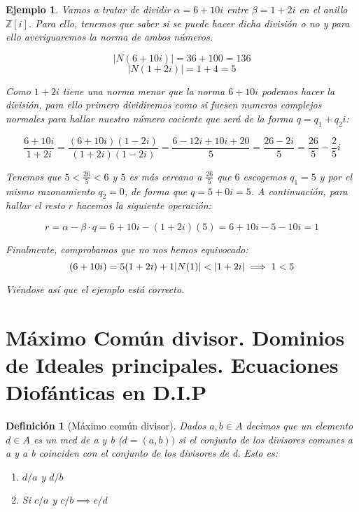 \documentclass[11pt, a4paper, titlepage]{article}
\providecommand{\ent}{\mathbb{Z}}
\providecommand{\abs}[1]{\lvert#1\rvert}
\theoremstyle{theorem-style}
\theoremstyle{definition-style}
\newtheorem*{ndef}{Definición}
\theoremstyle{remark-style}
\theoremstyle{example-style}
\newtheorem*{ejemplo}{Ejemplo}
\newenvironment{nlist}
{\begin{enumerate}
\renewcommand\labelenumi{(\emph{\roman{enumi})}}}
{\end{enumerate}}
\begin{document}
\begin{ejemplo}
Vamos a tratar de dividir $\alpha=6+10i$ entre $\beta=1+2i$ en el anillo $\ent[i]$. Para ello, tenemos que saber si se puede hacer dicha división o no y para ello averiguaremos la norma de ambos números.

$$\abs{N(6+10i)}=36+100=136$$
$$\abs{N(1+2i)}=1+4=5$$

Como $1+2i$ tiene una norma menor que la norma $6+10i$ podemos hacer la división, para ello primero dividiremos como si fuesen numeros complejos normales para hallar nuestro número cociente que será de la forma $q=q_1+q_2i$:

\[
	\frac{6+10i}{1+2i}=\frac{(6+10i)(1-2i)}{(1+2i)(1-2i)}=\frac{6-12i+10i+20}{5}=\frac{26-2i}{5}=\frac{26}{5}-\frac{2}{5}i
\]

Tenemos que $5<\frac{26}{5}<6$ y $5$ es más cercano a $\frac{26}{5}$ que $6$ escogemos $q_1=5$ y por el mismo razonamiento $q_2=0$, de forma que $q=5+0i=5$. A continuación, para hallar el resto $r$ hacemos la siguiente operación:

\[
	r=\alpha-\beta \cdot q = 6+10i - (1+2i)(5)=6+10i-5-10i=1
\]

Finalmente, comprobamos que no nos hemos equivocado:
\[
	(6+10i)=5(1+2i)+1\\
	\abs{N(1)}<\abs{1+2i} \implies 1<5
\]

Viéndose así que el ejemplo está correcto.

\end{ejemplo}

\section{Máximo Común divisor. Dominios de Ideales principales. Ecuaciones Diofánticas en D.I.P}


\begin{ndef}[Máximo común divisor]

Dados $a,b \in A$ decimos que un elemento $d\in A$ es un mcd de a y b ($d=(a,b))$ si el conjunto de los divisores comunes a a y a b coinciden con el conjunto de los divisores de d. Esto es:

\begin{nlist}
	\item $d/a$ y $d/b$
	\item Si $c/a$ y $c/b \implies c/d$ 
\end{nlist} 
	
\end{ndef}
\end{document}
